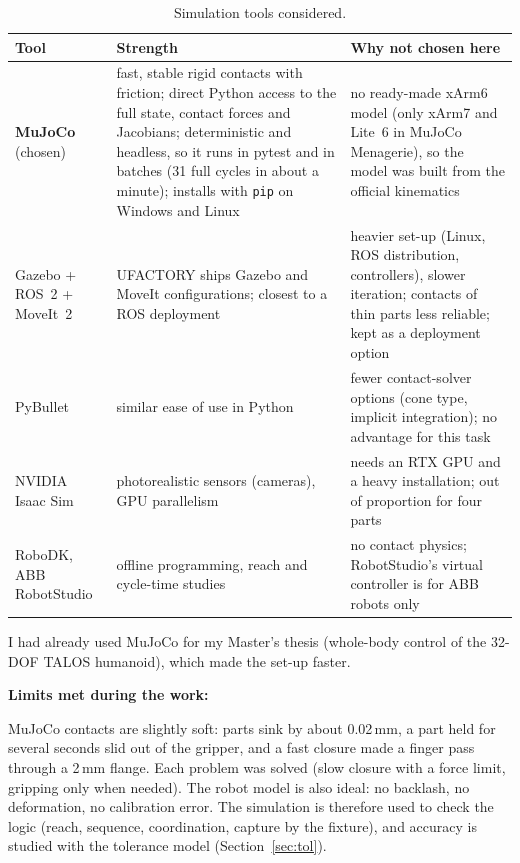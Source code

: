 \documentclass[11pt,a4paper]{article}
\newcommand{\code}[1]{\texttt{#1}}
\begin{document}
\begin{table}[H]
\centering
\caption{Simulation tools considered.}
\label{tab:sim}
\small
\begin{tabularx}{\textwidth}{@{}p{2.8cm} L L@{}}
\toprule
Tool & Strength & Why not chosen here\\
\midrule
\textbf{MuJoCo} (chosen) & fast, stable rigid contacts with friction; direct Python access to
the full state, contact forces and Jacobians; deterministic and headless, so it runs in pytest
and in batches (31 full cycles in about a minute); installs with \code{pip} on Windows and Linux &
no ready-made xArm6 model (only xArm7 and Lite~6 in MuJoCo Menagerie), so the model was built from
the official kinematics\\
Gazebo + ROS~2 + MoveIt~2 & UFACTORY ships Gazebo and MoveIt configurations; closest to a ROS
deployment & heavier set-up (Linux, ROS distribution, controllers), slower iteration; contacts of
thin parts less reliable; kept as a deployment option\\
PyBullet & similar ease of use in Python & fewer contact-solver options (cone type, implicit
integration); no advantage for this task\\
NVIDIA Isaac Sim & photorealistic sensors (cameras), GPU parallelism & needs an RTX GPU and a heavy
installation; out of proportion for four parts\\
RoboDK, ABB RobotStudio & offline programming, reach and cycle-time studies & no contact physics;
RobotStudio's virtual controller is for ABB robots only\\
\bottomrule
\end{tabularx}
\end{table}

I had already used MuJoCo for my Master's thesis (whole-body control of the 32-DOF TALOS
humanoid), which made the set-up faster.

\textbf{Limits met during the work:}

MuJoCo contacts are slightly soft: parts sink by about 0.02\,mm, a part held for several seconds
slid out of the gripper, and a fast closure made a finger pass through a 2\,mm flange. Each problem
was solved (slow closure with a force limit, gripping only when needed). The robot model is also
ideal: no backlash, no deformation, no calibration error. The simulation is therefore used to check
the logic (reach, sequence, coordination, capture by the fixture), and accuracy is studied with the
tolerance model (Section~\ref{sec:tol}).
\end{document}
